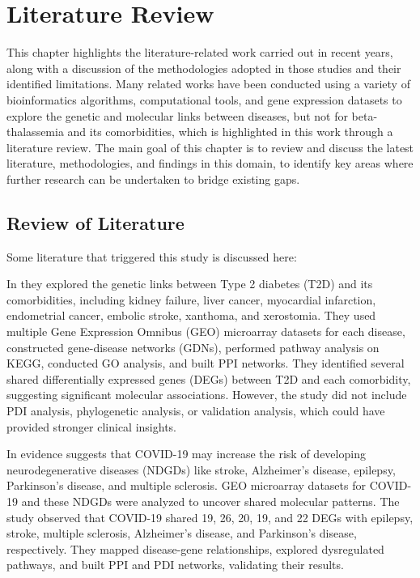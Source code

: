 \let\textcircled=\pgftextcircled
\chapter{Literature Review}
\label{chap:related}
This chapter highlights the literature-related work carried out in recent years, along with a discussion of the methodologies adopted in those studies and their identified limitations. Many related works have been conducted using a variety of bioinformatics algorithms, computational tools, and gene expression datasets to explore the genetic and molecular links between diseases, but not for beta-thalassemia and its comorbidities, which is highlighted in this work through a literature review. The main goal of this chapter is to review and discuss the latest literature, methodologies, and findings in this domain, to identify key areas where further research can be undertaken to bridge existing gaps.

\vspace{2mm}
\newpage

\section{Review of Literature}
\label{sec:sec2_1}
Some literature that triggered this study is discussed here:

In \cite{b3} they explored the genetic links between Type 2 diabetes (T2D) and its comorbidities, including kidney failure, liver cancer, myocardial infarction, endometrial cancer, embolic stroke, xanthoma, and xerostomia. They used multiple Gene Expression Omnibus (GEO) microarray datasets for each disease, constructed gene-disease networks (GDNs), performed pathway analysis on KEGG, conducted GO analysis, and built PPI networks. They identified several shared differentially expressed genes (DEGs) between T2D and each comorbidity, suggesting significant molecular associations. However, the study did not include PDI analysis, phylogenetic analysis, or validation analysis, which could have provided stronger clinical insights.

In \cite{b4} evidence suggests that COVID-19 may increase the risk of developing neurodegenerative diseases (NDGDs) like stroke, Alzheimer's disease, epilepsy, Parkinson's disease, and multiple sclerosis. GEO microarray datasets for COVID-19 and these NDGDs were analyzed to uncover shared molecular patterns. The study observed that COVID-19 shared 19, 26, 20, 19, and 22 DEGs with epilepsy, stroke, multiple sclerosis, Alzheimer's disease, and Parkinson's disease, respectively. They mapped disease-gene relationships, explored dysregulated pathways, and built PPI and PDI networks, validating their results.


